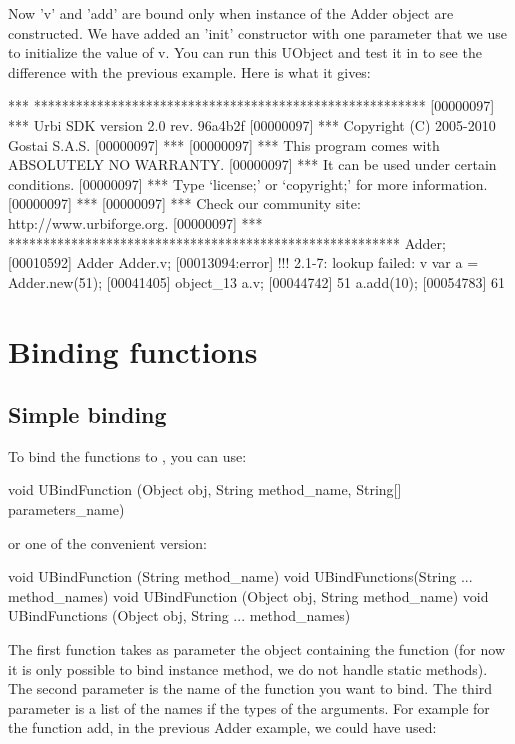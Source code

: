 Now 'v' and 'add' are bound only when instance of the Adder object are
constructed. We have added an 'init' constructor with one parameter that
we use to initialize the value of v. You can run this UObject and test
it in \urbi to see the difference with the previous example. Here is what
it gives:

\begin{urbiunchecked}
[00000097] *** ********************************************************
[00000097] *** Urbi SDK version 2.0 rev. 96a4b2f
[00000097] *** Copyright (C) 2005-2010 Gostai S.A.S.
[00000097] ***
[00000097] *** This program comes with ABSOLUTELY NO WARRANTY.
[00000097] *** It can be used under certain conditions.
[00000097] *** Type `license;' or `copyright;' for more information.
[00000097] ***
[00000097] *** Check our community site: http://www.urbiforge.org.
[00000097] *** ********************************************************
Adder;
[00010592] Adder
Adder.v;
[00013094:error] !!! 2.1-7: lookup failed: v
var a = Adder.new(51);
[00041405] object_13
a.v;
[00044742] 51
a.add(10);
[00054783] 61
\end{urbiunchecked}


\section{Binding functions}
\label{sec:uob:apijava:func}

\subsection{Simple binding}

To bind the functions to \urbi, you can use:
\begin{java}
void UBindFunction (Object obj, String method_name, String[] parameters_name)
\end{java}
or one of the convenient version:
\begin{java}
void UBindFunction (String method_name)
void UBindFunctions(String ... method_names)
void UBindFunction (Object obj, String method_name)
void UBindFunctions (Object obj, String ... method_names)
\end{java}

The first function takes as parameter the object containing the function
(for now it is only possible to bind instance method, we do not handle static
methods). The second parameter is the name of the function you want to bind.
The third parameter is a list of the names if the types of the arguments.
For example for the function add, in the previous Adder example, we could have
used:

